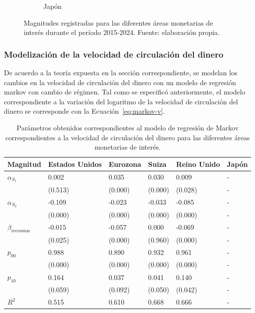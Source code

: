 \documentclass[titlepage, 12pt]{article}
\begin{document}
\begin{figure}
\begin{subfigure}[b]{0.49\textwidth}
        \caption{Japón}
    \end{subfigure}
    \caption{Magnitudes registradas para las diferentes áreas monetarias de interés durante el período 2015-2024. Fuente: elaboración propia.}
    \label{fig:magnitudes}
\end{figure}

\subsubsection{Modelización de la velocidad de circulación del dinero}

De acuerdo a la teoría expuesta en la sección correspondiente, se modelan los cambios en la velocidad de circulación del dinero con un modelo de regresión markov con cambio de régimen. Tal como se especificó anteriormente, el modelo correspondiente a la variación del logaritmo de la velocidad de circulación del dinero se corresponde con la Ecuación~\ref{eq:markov-v}.


\begin{table}
    \centering
    \singlespacing
    \begin{tabular}{llllll}
        \toprule
        Magnitud                     & Estados Unidos & Eurozona & Suiza   & Reino Unido & Japón \\
        \midrule
        $\alpha_{S_1}$               & 0.002          & 0.035    & 0.030   & 0.009       & -     \\
                                     & (0.513)        & (0.000)  & (0.000) & (0.028)     & -     \\
        $\alpha_{S_2}$               & -0.109         & -0.023   & -0.033  & -0.085      & -     \\
                                     & (0.000)        & (0.000)  & (0.000) & (0.000)     & -     \\
        $\beta_{\mathrm{recession}}$ & -0.015         & -0.057   & 0.000   & -0.069      & -     \\
                                     & (0.025)        & (0.000)  & (0.960) & (0.000)     & -     \\
        $p_{00}$                     & 0.988          & 0.890    & 0.932   & 0.961       & -     \\
                                     & (0.000)        & (0.000)  & (0.000) & (0.000)     & -     \\
        $p_{10}$                     & 0.164          & 0.037    & 0.041   & 0.140       & -     \\
                                     & (0.059)        & (0.092)  & (0.050) & (0.042)     & -     \\
        $R^2$                        & 0.515          & 0.610    & 0.668   & 0.666       & -     \\
        \bottomrule
    \end{tabular}
    \caption{Parámetros obtenidos correspondientes al modelo de regresión de Markov correspondientes a la velocidad de circulación del dinero para las diferentes áreas monetarias de interés.}
    \label{tab:v-markov-params}
\end{table}
\end{document}
